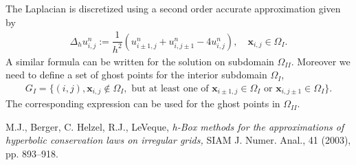 \documentclass[10pt,a4paper,twoside, french]{article}
\numberwithin{equation}{section}
\numberwithin{figure}{section}
\numberwithin{table}{section}
\newcommand{\bx}{\mathbf{x}}
\begin{document}
The Laplacian is discretized using a second order accurate approximation given by 
\begin{align}
\Delta_h u_{i,j}^n := \dfrac{1}{h^2}\left( u_{i\pm1,j}^n+u_{i,j\pm1}^n-4u_{i,j}^n\right), \quad \bx_{i,j}\in\Omega_I.
\end{align}
A similar formula can be written for the solution on subdomain $\Omega_{II}$. Moreover we need to define a set of ghost points for the interior subdomain $\Omega_{I}$,
\begin{align}
G_I = \lbrace (i,j), \bx_{i,j}\notin \Omega_I, \text{ but at least one of } \bx_{i\pm1,j}\in\Omega_I \text{ or } \bx_{i,j\pm1}\in\Omega_I\rbrace.
\end{align}
The corresponding expression can be used for the ghost points in $\Omega_{II}$. 


\begin{center}
\begin{minipage}[c]{0.5\textwidth}
\centering
{}
\end{minipage}
\end{center}












\begin{thebibliography}{0}

M.J., Berger, C. Helzel, R.J., LeVeque,
\emph{h-Box methods for the approximations of hyperbolic conservation laws on irregular grids,}
SIAM J. Numer. Anal., 41 (2003), pp. 893--918.


\end{thebibliography}	
	
\end{document}
